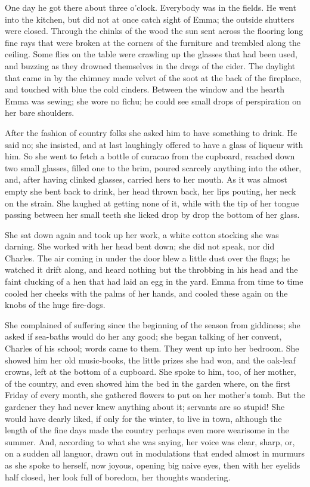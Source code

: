 \documentclass[11pt,twocolumn]{ltugboat}
\begin{document}
One day he got there about three o'clock. Everybody was in the fields.
He went into the kitchen, but did not at once catch sight of Emma; the
outside shutters were closed. Through the chinks of the wood the sun
sent across the flooring long fine rays that were broken at the corners
of the furniture and trembled along the ceiling. Some flies on the table
were crawling up the glasses that had been used, and buzzing as they
drowned themselves in the dregs of the cider. The daylight that came in
by the chimney made velvet of the soot at the back of the fireplace, and
touched with blue the cold cinders. Between the window and the hearth
Emma was sewing; she wore no fichu; he could see small drops of
perspiration on her bare shoulders.

After the fashion of country folks she asked him to have something to
drink. He said no; she insisted, and at last laughingly offered to have
a glass of liqueur with him. So she went to fetch a bottle of curacao
from the cupboard, reached down two small glasses, filled one to the
brim, poured scarcely anything into the other, and, after having clinked
glasses, carried hers to her mouth. As it was almost empty she bent
back to drink, her head thrown back, her lips pouting, her neck on the
strain. She laughed at getting none of it, while with the tip of her
tongue passing between her small teeth she licked drop by drop the
bottom of her glass.

She sat down again and took up her work, a white cotton stocking she was
darning. She worked with her head bent down; she did not speak, nor did
Charles. The air coming in under the door blew a little dust over the
flags; he watched it drift along, and heard nothing but the throbbing
in his head and the faint clucking of a hen that had laid an egg in the
yard. Emma from time to time cooled her cheeks with the palms of her
hands, and cooled these again on the knobs of the huge fire-dogs.

She complained of suffering since the beginning of the season from
giddiness; she asked if sea-baths would do her any good; she began
talking of her convent, Charles of his school; words came to them. They
went up into her bedroom. She showed him her old music-books, the little
prizes she had won, and the oak-leaf crowns, left at the bottom of a
cupboard. She spoke to him, too, of her mother, of the country, and even
showed him the bed in the garden where, on the first Friday of every
month, she gathered flowers to put on her mother's tomb. But the
gardener they had never knew anything about it; servants are so stupid!
She would have dearly liked, if only for the winter, to live in town,
although the length of the fine days made the country perhaps even more
wearisome in the summer. And, according to what she was saying, her
voice was clear, sharp, or, on a sudden all languor, drawn out in
modulations that ended almost in murmurs as she spoke to herself, now
joyous, opening big naive eyes, then with her eyelids half closed, her
look full of boredom, her thoughts wandering.
\end{document}

